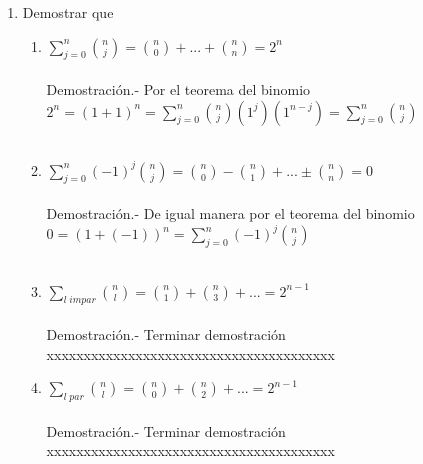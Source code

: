 \begin{enumerate}
\begin{enumerate}[\bfseries (a)]
\item Demostrar que 
\begin{enumerate}[\bfseries (i)]
\item $\displaystyle\sum_{j=0}^{n} {n \choose j} = {n \choose 0} + ... + {n \choose n} = 2^n$\\\\
Demostración.- \; Por el teorema del binomio $2^n=(1+1)^n = \displaystyle\sum_{j=0}^n {n \choose j}(1^j)(1^{n-j})=\sum_{j=0}^n {n \choose j}$\\\\

\item $\displaystyle\sum_{j=0}^n (-1)^j {n \choose j} = {n \choose 0}- {n \choose 1}+...\pm {n \choose n} =0$\\\\
Demostración.- \;  De igual manera por el teorema del binomio $0=(1+(-1))^n = \displaystyle\sum_{j=0}^n(-1)^j {n \choose j}$\\\\ 

\item $\displaystyle\sum_{l \; impar} {n \choose l} = {n \choose 1} + {n \choose 3}+ ... = 2^{n-1}$\\\\
Demostración.- \;  {\color{green}Terminar demostración xxxxxxxxxxxxxxxxxxxxxxxxxxxxxxxxxxxxxxx}

\item $\displaystyle\sum_{l \; par} {n \choose l} = {n \choose 0} + {n \choose 2} + ...  = 2^{n-1}$\\\\
Demostración.- \; {\color{green}Terminar demostración xxxxxxxxxxxxxxxxxxxxxxxxxxxxxxxxxxxxxxx}
\end{enumerate}
\end{enumerate}


\end{enumerate}
